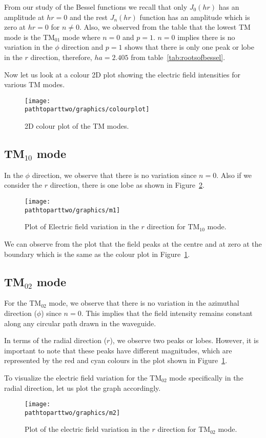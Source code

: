 From our study of the Bessel functions we recall that only $J_0(hr)$ has an amplitude at $hr = 0$ and the rest $J_n(hr)$ function has an amplitude which is zero at $hr = 0$ for $n \ne 0$. Also, we observed from the table that the lowest TM mode is the TM$_{01}$ mode where $n = 0$ and $p = 1$. $n = 0$ implies there is no variation in the $\phi$ direction and $p = 1$ shows that there is only one peak or lobe in the $r$ direction, therefore, $ha = 2.405$ from table~\ref{tab:rootsofbessel}. 

Now let us look at a colour 2D plot showing the electric field intensities for various TM modes.
\begin{figure}[h]
\centering
\texttt{[image: \\pathtoparttwo/graphics/colourplot]}
\caption{2D colour plot of the TM modes.}
\label{fig:colourplot}
\end{figure}

\subsection{TM$_{10}$ mode}
In the $\phi$ direction, we observe that there is no variation since $n=0$. Also if we consider the $r$ direction, there is one lobe as shown in Figure~\ref{fig:m1}.
\begin{figure}[h]
\centering
\texttt{[image: \\pathtoparttwo/graphics/m1]}
\caption{Plot of Electric field variation in the $r$ direction for TM$_{10}$ mode.}
\label{fig:m1}
\end{figure}

We can observe from the plot that the field peaks at the centre and at zero at the boundary which is the same as the colour plot in Figure~\ref{fig:colourplot}.
   
\subsection{TM$_{02}$ mode}
For the TM$_{02}$ mode, we observe that there is no variation in the azimuthal direction ($\phi$) since $n=0$. This implies that the field intensity remains constant along any circular path drawn in the waveguide.

In terms of the radial direction ($r$), we observe two peaks or lobes. However, it is important to note that these peaks have different magnitudes, which are represented by the red and cyan colours in the plot shown in Figure~\ref{fig:colourplot}. 

To visualize the electric field variation for the TM$_{02}$ mode specifically in the radial direction, let us plot the graph accordingly.
\begin{figure}[h]
\centering
\texttt{[image: \\pathtoparttwo/graphics/m2]}
\caption{Plot of the electric field variation in the $r$ direction for TM$_{02}$ mode.}
\label{fig:m2}
\end{figure}

